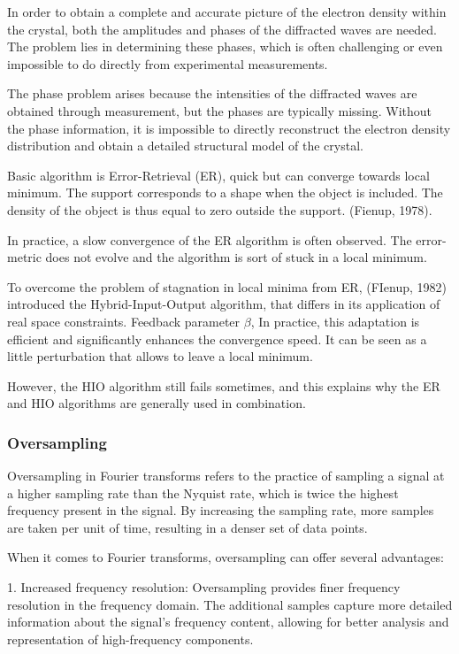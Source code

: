 In order to obtain a complete and accurate picture of the electron density within the crystal, both the amplitudes and phases of the diffracted waves are needed. The problem lies in determining these phases, which is often challenging or even impossible to do directly from experimental measurements.

The phase problem arises because the intensities of the diffracted waves are obtained through measurement, but the phases are typically missing. Without the phase information, it is impossible to directly reconstruct the electron density distribution and obtain a detailed structural model of the crystal.

Basic algorithm is Error-Retrieval (ER), quick but can converge towards local minimum. 
The support corresponds to a shape when the object is included. The density of the object is thus equal to zero outside the support. (Fienup, 1978).

In practice, a slow convergence of the ER algorithm is often observed. The error-metric does not evolve and the algorithm is sort of stuck in a local minimum.

To overcome the problem of stagnation in local minima from ER, (FIenup, 1982) introduced the Hybrid-Input-Output algorithm, that differs in its application of real space constraints. Feedback parameter $\beta$, 
In practice, this adaptation is efficient and significantly enhances the convergence speed. It can be seen as a little perturbation that allows to leave a local minimum.


However, the HIO algorithm still fails sometimes, and this explains why the ER and HIO algorithms are generally used in combination.

\subsubsection{Oversampling}
Oversampling in Fourier transforms refers to the practice of sampling a signal at a higher sampling rate than the Nyquist rate, which is twice the highest frequency present in the signal. By increasing the sampling rate, more samples are taken per unit of time, resulting in a denser set of data points.

When it comes to Fourier transforms, oversampling can offer several advantages:

1. Increased frequency resolution: Oversampling provides finer frequency resolution in the frequency domain. The additional samples capture more detailed information about the signal's frequency content, allowing for better analysis and representation of high-frequency components.

